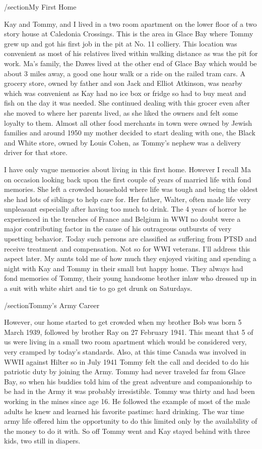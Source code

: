 /section{My First Home}

Kay and Tommy, and I lived in a two room apartment on the lower floor of a two story house at Caledonia Crossings. This is the area in Glace Bay where Tommy grew up and got his first job in the pit at No. 11 colliery. This location was convenient as most of his relatives lived within walking distance as was the pit for work. Ma's family, the Dawes lived at the other end of Glace Bay which would be about 3 miles away, a good one hour walk or a ride on the railed tram cars. A grocery store, owned by father and son Jack and Elliot Atkinson, was nearby which was convenient as Kay had no ice box or fridge so had to buy meat and fish on the day it was needed. She continued dealing with this grocer even after she moved to where her parents lived, as she liked the owners and felt some loyalty to them. Almost all other food merchants in town were owned by Jewish families and around 1950 my mother decided to start dealing with one, the Black and White store, owned by Louis Cohen, as Tommy's nephew was a delivery driver for that store.

I have only vague memories about living in this first home. However I recall Ma on occasion looking back upon the first couple of years of married life with fond memories. She left a crowded household where life was tough and being the oldest she had lots of siblings to help care for. Her father, Walter, often made life very unpleasant especially after having too much to drink. The 4 years of horror he experienced in the trenches of France and Belgium in WWI no doubt were a major contributing factor in the cause of his outrageous outbursts of very upsetting behavior. Today such persons are classified as suffering from PTSD and receive treatment and compensation. Not so for WWI veterans. I'll address this aspect later. My aunts told me of how much they enjoyed visiting and spending a night with Kay and Tommy in their small but happy home. They always had fond memories of Tommy, their young handsome brother inlaw who dressed up in a suit with white shirt and tie to go get drunk on Saturdays.

/section{Tommy's Army Career}

However, our home started to get crowded when my brother Bob was born 5 March 1939, followed by brother Ray on 27 February 1941. This meant that 5 of us were living in a small two room apartment which would be considered very, very cramped by today's standards. Also, at this time Canada was involved in WWII against Hilter so in July 1941 Tommy felt the call and decided to do his patriotic duty by joining the Army. Tommy had never traveled far from Glace Bay, so when his buddies told him of the great adventure and companionship to be had in the Army it was probably irresistible. Tommy was thirty and had been working in the mines since age 16. He followed the example of most of the male adults he knew and learned his favorite pastime: hard drinking. The war time army life offered him the opportunity to do this limited only by the availability of the money to do it with. So off Tommy went and Kay stayed behind with three kids, two still in diapers.


